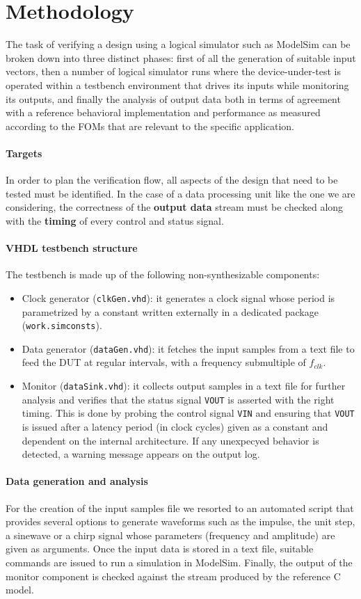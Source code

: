 \section{Methodology}
The task of verifying a design using a logical simulator such as ModelSim can be broken down into three distinct phases: first of all the generation of suitable input vectors, then a number of logical simulator runs where the device-under-test is operated within a testbench environment that drives its inputs while monitoring its outputs, and finally the analysis of output data both in terms of agreement with a reference behavioral implementation and performance as measured according to the FOMs that are relevant to the specific application.

\paragraph{Targets} In order to plan the verification flow, all aspects of the design that need to be tested must be identified. In the case of a data processing unit like the one we are considering, the correctness of the \textbf{output data} stream must be checked along with the \textbf{timing} of every control and status signal.

\paragraph{VHDL testbench structure} The testbench is made up of the following non-synthesizable components:
\begin{itemize}
	\item Clock generator (\texttt{clkGen.vhd}): it generates a clock signal whose period is parametrized by a constant written externally in a dedicated package (\texttt{work.simconsts}).
	\item Data generator (\texttt{dataGen.vhd}): it fetches the input samples from a text file to feed the DUT at regular intervals, with a frequency submultiple of $f_{clk}$.
	\item Monitor (\texttt{dataSink.vhd}): it collects output samples in a text file for further analysis and verifies that the status signal \texttt{VOUT} is asserted with the right timing. This is done by probing the control signal \texttt{VIN} and ensuring that \texttt{VOUT} is issued after a latency period (in clock cycles) given as a constant and dependent on the internal architecture. If any unexpecyed behavior is detected, a warning message appears on the output log.
\end{itemize}

\paragraph{Data generation and analysis} For the creation of the input samples file we resorted to an automated script that provides several options to generate waveforms such as the impulse, the unit step, a sinewave or a chirp signal whose parameters (frequency and amplitude) are given as arguments. Once the input data is stored in a text file, suitable commands are issued to run a simulation in ModelSim. Finally, the output of the monitor component is checked against the stream produced by the reference C model.
